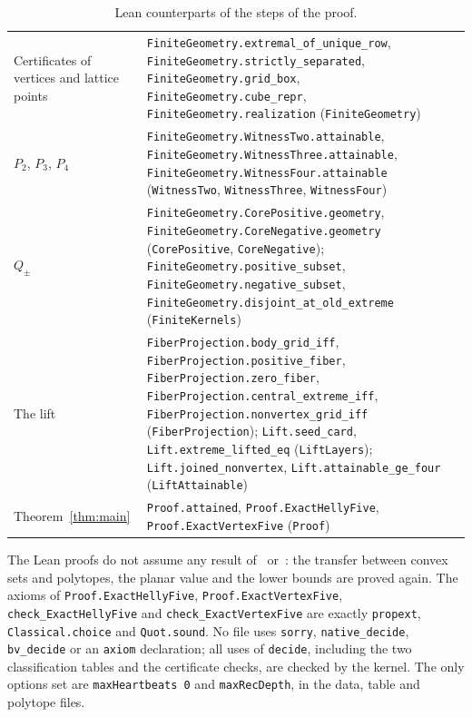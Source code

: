 \documentclass[11pt]{article}
\theoremstyle{definition}
\theoremstyle{remark}
\begin{document}
{\begin{table}[!htbp]
\begin{tabular}{@{}>{\raggedright\arraybackslash}p{}>{\raggedright\arraybackslash}p{}@{}}
Certificates of vertices and lattice points &
\texttt{FiniteGeometry.extremal\_of\_unique\_row},
\texttt{FiniteGeometry.strictly\_separated}, \texttt{FiniteGeometry.grid\_box},
\texttt{FiniteGeometry.cube\_repr}, \texttt{FiniteGeometry.realization}
(\texttt{FiniteGeometry}) \\
$P_2$, $P_3$, $P_4$ &
\texttt{FiniteGeometry.WitnessTwo.attainable},
\texttt{FiniteGeometry.WitnessThree.attainable},
\texttt{FiniteGeometry.WitnessFour.attainable} (\texttt{WitnessTwo},
\texttt{WitnessThree}, \texttt{WitnessFour}) \\
$Q_\pm$ &
\texttt{FiniteGeometry.CorePositive.geometry},
\texttt{FiniteGeometry.CoreNegative.geometry} (\texttt{CorePositive},
\texttt{CoreNegative}); \texttt{FiniteGeometry.positive\_subset},
\texttt{FiniteGeometry.negative\_subset},
\texttt{FiniteGeometry.disjoint\_at\_old\_extreme} (\texttt{FiniteKernels}) \\
The lift &
\texttt{FiberProjection.body\_grid\_iff}, \texttt{FiberProjection.positive\_fiber},
\texttt{FiberProjection.zero\_fiber}, \texttt{FiberProjection.central\_extreme\_iff},
\texttt{FiberProjection.nonvertex\_grid\_iff} (\texttt{FiberProjection});
\texttt{Lift.seed\_card}, \texttt{Lift.extreme\_lifted\_eq} (\texttt{LiftLayers});
\texttt{Lift.joined\_nonvertex}, \texttt{Lift.attainable\_ge\_four}
(\texttt{LiftAttainable}) \\
Theorem~\ref{thm:main} &
\texttt{Proof.attained}, \texttt{Proof.ExactHellyFive},
\texttt{Proof.ExactVertexFive} (\texttt{Proof}) \\
\hline
\end{tabular}
\caption{Lean counterparts of the steps of the proof.}
\label{tab:lean}
\end{table}

\noindent The Lean proofs do not assume any result of~\cite{agm}
or~\cite{chz}: the transfer between convex sets and polytopes, the planar value
and the lower bounds are proved again. The axioms of
\texttt{Proof.ExactHellyFive}, \texttt{Proof.ExactVertexFive},
\texttt{check\_ExactHellyFive} and \texttt{check\_ExactVertexFive} are exactly
\texttt{propext}, \texttt{Classical.choice} and \texttt{Quot.sound}. No file
uses \texttt{sorry}, \texttt{native\_\allowbreak decide},
\texttt{bv\_\allowbreak decide} or an \texttt{axiom} declaration; all uses of
\texttt{decide}, including the two classification tables and the certificate
checks, are checked by the kernel. The only options set are
\texttt{maxHeartbeats 0} and \texttt{maxRecDepth}, in the data, table and
polytope files.

}
\end{document}
